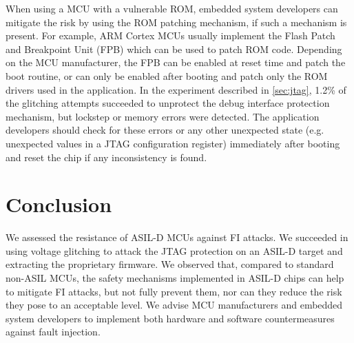 \documentclass[a4paper, 10pt]{article}
\begin{document}
When using a MCU with a vulnerable ROM, embedded system developers can mitigate the risk by using the ROM patching mechanism, if such a mechanism is present. For example, ARM Cortex MCUs usually implement the Flash Patch and Breakpoint Unit (FPB) which can be used to patch ROM code. Depending on the MCU manufacturer, the FPB can be enabled at reset time and patch the boot routine, or can only be enabled after booting and patch only the ROM drivers used in the application. In the experiment described in \autoref{sec:jtag}, 1.2\% of the glitching attempts succeeded to unprotect the debug interface protection mechanism, but lockstep or memory errors were detected. The application developers should check for these errors or any other unexpected state (e.g. unexpected values in a JTAG configuration register) immediately after booting and reset the chip if any inconsistency is found.

\section{Conclusion}
We assessed the resistance of ASIL-D MCUs against FI attacks. We succeeded in using voltage glitching to attack the JTAG protection on an ASIL-D target and extracting the proprietary firmware. We observed that, compared to standard non-ASIL MCUs, the safety mechanisms implemented in ASIL-D chips can help to mitigate FI attacks, but not fully prevent them, nor can they reduce the risk they pose to an acceptable level. We advise MCU manufacturers and embedded system developers to implement both hardware and software countermeasures against fault injection.
\end{document}
